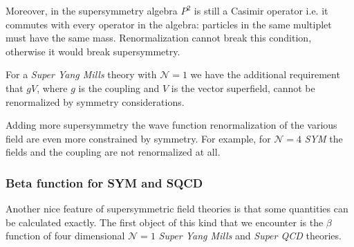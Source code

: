 Moreover, in the supersymmetry algebra $P^2$ is still a Casimir operator i.e. it commutes with every operator in the algebra: particles in the same multiplet must have the same mass.
Renormalization cannot break this condition, otherwise it would break supersymmetry.

For a \emph{Super Yang Mills} theory with $\mathcal{N} = 1$ we have the additional requirement that $g V$, where $g$ is the coupling and $V$ is the vector superfield, cannot be renormalized by symmetry considerations. 

Adding more supersymmetry the wave function renormalization of the various field are even more constrained by symmetry.
For example, for $\mathcal{N}=4$ \emph{SYM} the fields and the coupling are not renormalized at all.








\subsubsection{Beta function for SYM and SQCD}
Another nice feature of supersymmetric field theories is that some quantities can be calculated exactly.
The first object of this kind that we encounter is the $\beta$ function of four dimensional $\mathcal{N} =  1 $ \emph{Super Yang Mills} and \emph{Super QCD} theories.

